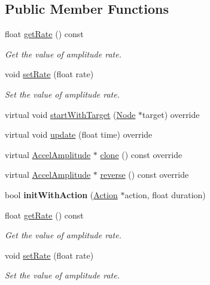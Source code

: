 \subsection*{Public Member Functions}
\begin{DoxyCompactItemize}
\item 
float \hyperlink{classAccelAmplitude_a890ef366cbe8aeb077fb6b3a2c3324b0}{get\+Rate} () const
\begin{DoxyCompactList}\small\item\em Get the value of amplitude rate. \end{DoxyCompactList}\item 
void \hyperlink{classAccelAmplitude_a9d6078516cdd0489b0c4b2665e634e3f}{set\+Rate} (float rate)
\begin{DoxyCompactList}\small\item\em Set the value of amplitude rate. \end{DoxyCompactList}\item 
virtual void \hyperlink{classAccelAmplitude_ae8d088ea86d2ade5282f10a785d1e0a8}{start\+With\+Target} (\hyperlink{classNode}{Node} $\ast$target) override
\item 
virtual void \hyperlink{classAccelAmplitude_adfd14b34a7bf24c50f9090aa187bb603}{update} (float time) override
\item 
virtual \hyperlink{classAccelAmplitude}{Accel\+Amplitude} $\ast$ \hyperlink{classAccelAmplitude_aadcd81e8ae9f9d3e32541995b75eca51}{clone} () const override
\item 
virtual \hyperlink{classAccelAmplitude}{Accel\+Amplitude} $\ast$ \hyperlink{classAccelAmplitude_a9264913ab0a54485fd26f7110fdd0921}{reverse} () const override
\item 
\mbox{\label{classAccelAmplitude_a1ab884e63ec5270e75eb5995bcd68539}} 
bool {\bfseries init\+With\+Action} (\hyperlink{classAction}{Action} $\ast$action, float duration)
\item 
float \hyperlink{classAccelAmplitude_a890ef366cbe8aeb077fb6b3a2c3324b0}{get\+Rate} () const
\begin{DoxyCompactList}\small\item\em Get the value of amplitude rate. \end{DoxyCompactList}\item 
void \hyperlink{classAccelAmplitude_a9d6078516cdd0489b0c4b2665e634e3f}{set\+Rate} (float rate)
\begin{DoxyCompactList}\small\item\em Set the value of amplitude rate. \end{DoxyCompactList}\item 

\end{DoxyCompactItemize}
